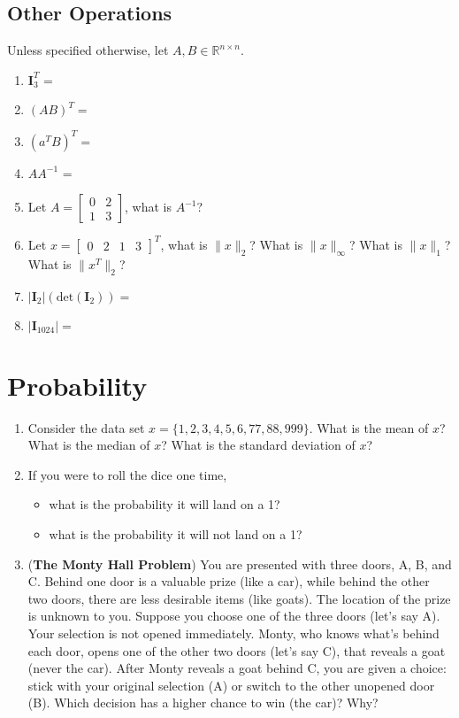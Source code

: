 \documentclass{assignment}
\newcommand{\R}{\mathbb{R}}
\begin{document}
\begin{problem}
\subsection{Other Operations}
\noindent Unless specified otherwise, let $A, B \in \R^{n\times n}$.
\begin{enumerate}
    \item $\mathbf{I}_3^T$ =
    \item $(AB)^T = $
    \item $(a^TB)^T = $
    \item $AA^{-1}$ = 
    \item Let $A =\begin{bmatrix} 0 & 2 \\ 1 & 3 \end{bmatrix}$, what is $A^{-1}$?
    \item Let $x = \begin{bmatrix} 0 & 2 & 1 & 3 \end{bmatrix}^T$, what is $\lVert x \rVert_2$? What is $\lVert x \rVert_{\infty}$? What is $\lVert x \rVert_1$? What is $\lVert x^T \rVert_2$?
    \item $\lvert \mathbf{I}_{2}\rvert (\text{det}(\mathbf{I}_2)) = $
    \item $\lvert \mathbf{I}_{1024}\rvert = $
\end{enumerate}
\newpage
\section{Probability}

\begin{enumerate}
    \item Consider the data set $x = \{1, 2, 3, 4, 5, 6, 77, 88, 999\}$. What is the mean of $x$? What is the median of $x$? What is the standard deviation of $x$?
    \item If you were to roll the dice one time, 
    \begin{itemize}
        \item what is the probability it will land on a 1?
        \item what is the probability it will not land on a 1?
    \end{itemize}
    \item (\textbf{The Monty Hall Problem}) You are presented with three doors, A, B, and C. Behind one door is a valuable prize (like a car), while behind the other two doors, there are less desirable items (like goats). The location of the prize is unknown to you. Suppose you choose one of the three doors (let's say A). Your selection is not opened immediately. Monty, who knows what's behind each door, opens one of the other two doors (let's say C), that reveals a goat (never the car). After Monty reveals a goat behind C, you are given a choice: stick with your original selection (A) or switch to the other unopened door (B). Which decision has a higher chance to win (the car)? Why?
\end{enumerate}


\end{problem}
\end{document}
